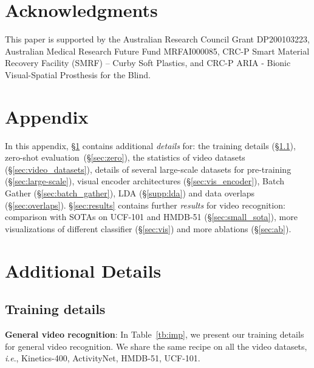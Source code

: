 \documentclass[letterpaper]{article} \usepackage{aaai23}  \usepackage{times}  \usepackage{helvet}  \usepackage{courier}  \usepackage[hyphens]{url}  \usepackage{graphicx} \urlstyle{rm} \def\UrlFont{\rm}  \usepackage{natbib}  \usepackage{caption} \frenchspacing  \setlength{\pdfpagewidth}{8.5in}  \setlength{\pdfpageheight}{11in}  \usepackage{algorithm}
\newcommand{\ie}{\textit{i}.\textit{e}.}
\begin{document}
\section*{Acknowledgments}
This paper is supported by the Australian Research Council Grant DP200103223, Australian Medical Research Future Fund MRFAI000085, CRC-P Smart Material Recovery Facility (SMRF) – Curby Soft Plastics, and CRC-P ARIA - Bionic Visual-Spatial Prosthesis for the Blind.





\clearpage
\appendix
\section*{Appendix}
\setcounter{table}{0}
\setcounter{figure}{0}
\renewcommand{\thetable}{A.\arabic{table}}
\renewcommand{\thefigure}{A.\arabic{figure}}

In this appendix, 
\S\ref{supp:imp_details} contains additional \textit{details} for: the training details (\S\ref{sec:train_video}), zero-shot evaluation~(\S\ref{sec:zero}), the statistics of video datasets (\S\ref{sec:video_datasets}), details of several large-scale datasets for pre-training (\S\ref{sec:large-scale}), visual encoder architectures (\S\ref{sec:vis_encoder}), Batch Gather (\S\ref{sec:batch_gather}), LDA (\S\ref{supp:lda}) and data overlaps (\S\ref{sec:overlaps}).
\S\ref{sec:results} contains further \textit{results} for video recognition: comparison with SOTAs on UCF-101 and HMDB-51 (\S\ref{sec:small_sota}), more visualizations of different classifier (\S\ref{sec:vis}) and more ablations (\S\ref{sec:ab}).









\section{Additional Details}\label{supp:imp_details}


\subsection{Training details}\label{sec:train_video}
\textbf{General video recognition}: 
In Table~\ref{tb:imp}, we present our training details for general video recognition. We share the same recipe on all the video datasets, \ie, Kinetics-400, ActivityNet, HMDB-51, UCF-101.
\end{document}
